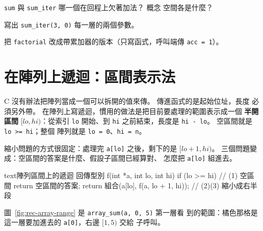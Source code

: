 
\begin{drills}[label=drills:rec-process]
\item \texttt{sum} 與 \texttt{sum\_iter} 哪一個在回程上欠著加法？ 概念
空間各是什麼？
\item 寫出 \texttt{sum\_iter(3, 0)} 每一層的兩個參數。
\item 把 \texttt{factorial} 改成帶累加器的版本（只寫函式，呼叫端傳
\texttt{acc = 1}）。
\end{drills}

\section{在陣列上遞迴：區間表示法}
\label{sec:rec-array}

C 沒有辦法把陣列當成一個可以拆開的值來傳。 傳進函式的是起始位址，長度
必須另外帶。 在陣列上寫遞迴，慣用的做法是把目前要處理的範圍表示成一個
\textbf{半開區間} $[lo, hi)$：從索引 \texttt{lo} 開始、到 \texttt{hi}
之前結束，長度是 \texttt{hi - lo}。 空區間就是 \texttt{lo >= hi}；整個
陣列就是 \texttt{lo = 0}、\texttt{hi = n}。

縮小問題的方式很固定：處理完 \texttt{a[lo]} 之後，剩下的是
$[lo+1, hi)$。 三個問題變成：空區間的答案是什麼、假設子區間已經算對、
怎麼把 \texttt{a[lo]} 組進去。

\begin{code}{text}{陣列區間上的遞迴}
回傳型別 f(int *a, int lo, int hi) {
    if (lo >= hi) {                    // (1) 空區間
        return 空區間的答案;
    }
    return 組合(a[lo], f(a, lo + 1, hi)); // (2)(3) 縮小成右半段
}
\end{code}

圖~\ref{fig:rec-array-range} 是 \texttt{array\_sum(a, 0, 5)} 第一層看
到的範圍：橘色那格是這一層要加進去的 \texttt{a[0]}，右邊 $[1, 5)$ 交給
子呼叫。

\begin{center}
\diagcaption{半開區間 $[0, 5)$。 橘色是這一層的 \texttt{a[lo]}，右邊
$[1, 5)$ 是子問題；\texttt{hi} 指向最後一格的右邊，本身不是一個元素。}
\label{fig:rec-array-range}
\end{center}

